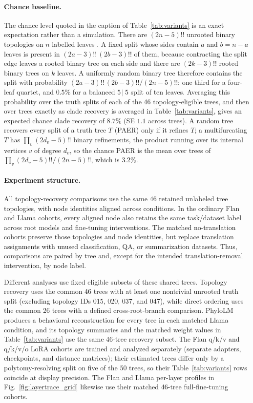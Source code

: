 \documentclass{article}
\theoremstyle{definition}
\theoremstyle{plain}
\begin{document}
\paragraph{Chance baseline.} The chance level quoted in the caption of Table~\ref{tab:variants} is an
exact expectation rather than a simulation. There are $(2n-5)!!$ unrooted binary topologies on $n$
labelled leaves \citep{sempleSteel2003phylogenetics}. A fixed split whose sides contain $a$ and
$b=n-a$ leaves is present in $(2a-3)!!\,(2b-3)!!$ of them, because contracting the split edge
leaves a rooted binary tree on each side and there are $(2k-3)!!$ rooted binary trees on $k$ leaves.
A uniformly random binary tree therefore contains the split with probability
$(2a-3)!!\,(2b-3)!!/(2n-5)!!$: one third for a four-leaf quartet, and $0.5\%$ for a balanced
$5\,|\,5$ split of ten leaves. Averaging this probability over the truth splits of each of the 46
topology-eligible trees, and then over trees exactly as clade recovery is averaged in
Table~\ref{tab:variants}, gives an expected chance clade recovery of $8.7\%$ (SE $1.1$ across
trees). A random tree recovers every split of a truth tree $T$ (PAER) only if it refines $T$; a
multifurcating $T$ has $\prod_v (2d_v-5)!!$ binary refinements, the product running over its
internal vertices $v$ of degree $d_v$, so the chance PAER is the mean over trees of
$\prod_v (2d_v-5)!!/(2n-5)!!$, which is $3.2\%$.

\paragraph{Experiment structure.} All topology-recovery comparisons use the same 46 retained
unlabeled tree topologies, with node identities aligned across conditions. In the ordinary Flan
and Llama cohorts, every aligned node also retains the same task/dataset label across root models
and fine-tuning interventions. The matched no-translation cohorts preserve those topologies
and node identities, but replace translation assignments with unused classification, QA, or
summarization datasets. Thus, comparisons are paired by tree and,
except for the intended translation-removal intervention, by node label.

Different analyses use fixed eligible subsets of these shared trees. Topology recovery uses the
common 46 trees with at least one nontrivial unrooted truth split (excluding topology IDs 015, 020,
037, and 047), while direct ordering uses the common 26 trees with a defined cross-root-branch
comparison. PhyloLM produces a behavioral reconstruction for every tree in each matched Llama
condition, and its topology summaries and the matched weight values in
Table~\ref{tab:variants} use the same 46-tree recovery subset. The Flan q/k/v and q/k/v/o LoRA cohorts are
trained and analyzed separately (separate adapters, checkpoints, and distance matrices); their
estimated trees differ only by a polytomy-resolving split on five of the 50 trees, so their
Table~\ref{tab:variants} rows coincide at display precision. The Flan and Llama per-layer profiles
in Fig.~\ref{fig:layertrace_grid} likewise use their matched 46-tree full-fine-tuning cohorts.
\end{document}
